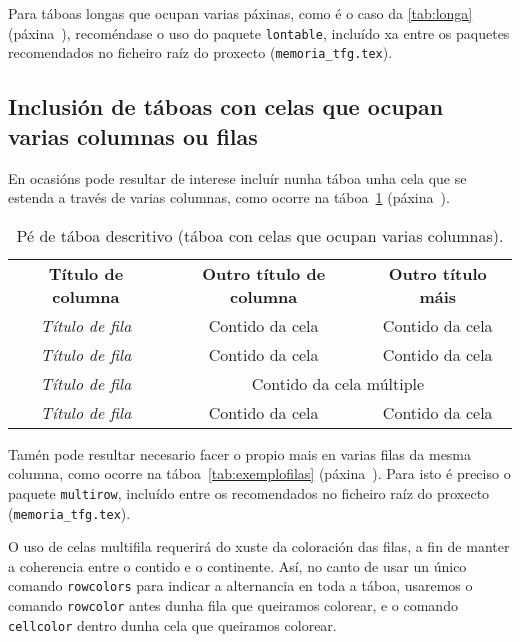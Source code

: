 Para táboas longas que ocupan varias páxinas, como é o caso da \ref{tab:longa}
(páxina~\pageref{tab:longa}), recoméndase o uso do paquete \texttt{lontable},
incluído xa entre os paquetes recomendados no ficheiro raíz do proxecto
(\verb+memoria_tfg.tex+).



\subsection{Inclusión de táboas con celas que ocupan varias columnas ou filas}

En ocasións pode resultar de interese incluír nunha táboa unha cela que se estenda
a través de varias columnas, como ocorre na táboa~\ref{tab:exemplocolumnas}
(páxina~\pageref{tab:exemplocolumnas}).

\begin{table}[hp!]
  \centering
  \begin{tabular}{c|c|c}
  \rowcolor{udcpink!25}
  \multicolumn{3}{c}{\textbf{Cela en varias columnas}} \\\hline
  \rowcolor{udcpink!25}
  \textbf{Título de columna} & \textbf{Outro título de columna} & \textbf{Outro título máis} \\\hline
  \textit{Título de fila}    & Contido da cela                  & Contido da cela \\
  \textit{Título de fila}    & Contido da cela                  & Contido da cela \\
  \textit{Título de fila}    & \multicolumn{2}{c}{Contido da cela múltiple} \\
  \textit{Título de fila}    & Contido da cela                  & Contido da cela \\
  \end{tabular}
  \caption{Pé de táboa descritivo (táboa con celas que ocupan varias columnas).}
  \label{tab:exemplocolumnas}
\end{table}

Tamén pode resultar necesario facer o propio mais en varias filas da mesma columna,
como ocorre na táboa~\ref{tab:exemplofilas} (páxina~\pageref{tab:exemplofilas}).
Para isto é preciso o paquete \texttt{multirow}, incluído entre os recomendados no
ficheiro raíz do proxecto (\verb+memoria_tfg.tex+).

O uso de celas multifila requerirá do xuste da coloración das filas, a fin de manter
a coherencia entre o contido e o continente. Así, no canto de usar un único comando
\verb+rowcolors+ para indicar a alternancia en toda a táboa, usaremos o comando
\verb+rowcolor+ antes dunha fila que queiramos colorear, e o comando \verb+cellcolor+
dentro dunha cela que queiramos colorear.

